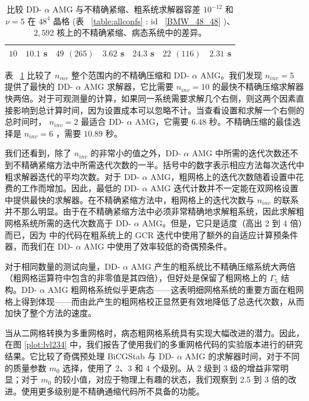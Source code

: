 \documentclass{siamltex}
\newcommand{\ninv}{n_\mathit{inv}}
\begin{document}
\begin{table}[ht]
{\begin{tabular}{ccccccc}
      $10 $                 & $10.1$        s                       & $ 49$                 $(265)$                      & $3.62$        s & $24.3$        s & $ 22$                 $(116)$ & $ 2.31$        s \\
      \bottomrule
    \end{tabular}}
  \caption{比较 DD-    $\alpha$    AMG 与不精确紧缩、粗系统求解器容差    $10^{-12}$    和    $\nu=5$    在    $48^4$    晶格 (表~    \ref{table:allconfs}    : id~    \ref{BMW_48_48}   )、   $2,\!592$    核上的不精确紧缩、病态系统中的差异。  }
  \label{table:DDMLvsID1}
\end{table}

表~    \ref{table:DDMLvsID1}    比较了    $\ninv$    整个范围内的不精确压缩和 DD-    $\alpha$    AMG。我们发现    $\ninv=5$    提供了最快的 DD-    $\alpha$    AMG 求解器，它比需要    $\ninv=10$    的最快不精确压缩求解器快两倍。对于可观测量的计算，如果同一系统需要求解几个右侧，则这两个因素直接影响到总计算时间，因为设置成本可以忽略不计。当查看设置和求解一个右侧的总时间时，   $\ninv=2$    最适合 DD-    $\alpha$    AMG，它需要    $6.48$    秒。不精确压缩的最佳选择是    $\ninv=6$   ，需要    $10.89$    秒。

我们还看到，除了    $\ninv$    的非常小的值之外，DD-   $\alpha$    AMG 中所需的迭代次数还不到不精确紧缩方法中所需迭代次数的一半。括号中的数字表示相应方法每次迭代中粗求解器迭代的平均次数。对于 DD-   $\alpha$    AMG，粗网格上的迭代次数随着设置中花费的工作而增加。因此，最低的 DD-   $\alpha$    AMG 迭代计数并不一定能在双网格设置中提供最快的求解器。在不精确紧缩方法中，粗网格上的迭代次数与    $\ninv$    的联系并不那么明显。由于在不精确紧缩方法中必须非常精确地求解粗系统，因此求解粗网格系统所需的迭代次数高于 DD-   $\alpha$    AMG。但是，它只是适度（高出 2 到 4 倍）而已，因为    \cite{wwwDDHMC}    中的代码在粗系统上的 GCR 迭代中使用了额外的自适应计算预条件器，而我们在 DD-   $\alpha$    AMG 中使用了效率较低的奇偶预条件。

对于相同数量的测试向量，DD-   $\alpha$    AMG 产生的粗系统比不精确压缩系统大两倍（粗网格运算符中包含的非零值是其四倍），但好处是保留了粗网格上的    $\Gamma_5$    结构。DD-   $\alpha$    AMG 粗网格系统似乎更病态——这表明细网格系统的重要方面在粗网格上得到体现——而由此产生的粗网格校正显然更有效地降低了总迭代次数，从而加快了整个方法的速度。

当从二网格转换为多重网格时，病态粗网格系统具有实现大幅改进的潜力。因此，在图    \ref{plot:lvl234}    中，我们报告了使用我们的多重网格代码的实验版本进行的研究结果。它比较了奇偶预处理 BiCGStab 与 DD-    $\alpha$    AMG 的求解器时间，对于不同的质量参数    $m_0$    选择，使用了 2、3 和 4 个级别。从 2 级到 3 级的增益非常明显；对于    $m_0$    的较小值，对应于物理上有趣的状态，我们观察到 2.5 到 3 倍的改进。使用更多级别是不精确通缩代码所不具备的功能。
\end{document}
